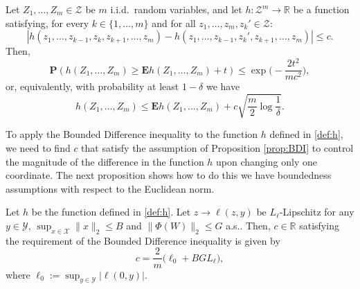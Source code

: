 \begin{proposition}
\label{prop:BDI}
Let $Z_1,\ldots,Z_m\in\mathcal{Z}$ be $m$ i.i.d.\ random variables, and let $h:\mathcal{Z}^m\rightarrow\mathbb{R}$ be a function satisfying, for every $k\in\{1,\ldots,m\}$ and for all $z_1,\ldots,z_m,z_k'\in\mathcal{Z}$:
$$
	| h(z_1,\ldots,z_{k-1},z_k,z_{k+1},\ldots,z_m) - h(z_1,\ldots,z_{k-1},z_k',z_{k+1},\ldots,z_m) | \le c.
$$
Then,
$$
	\mathbf{P}(h(Z_1,\ldots,Z_m) \ge \mathbf{E}h(Z_1,\ldots,Z_m) + t ) \le \exp\bigg(-\frac{2t^2}{m c^2}\bigg),
$$
or, equivalently, with probability at least $1-\delta$ we have
$$
	h(Z_1,\ldots,Z_m) \le \mathbf{E}h(Z_1,\ldots,Z_m) + c\sqrt{\frac{m}{2}\log\frac{1}{\delta}}.
$$
\end{proposition}
To apply the Bounded Difference inequality to the function $h$ defined in \eqref{def:h}, we need to find $c$ that satisfy the assumption of Proposition \ref{prop:BDI} to control the magnitude of the difference in the function $h$ upon changing only one coordinate. The next proposition shows how to do this we have boundedness assumptions with respect to the Euclidean norm.
\begin{proposition}
\label{prop:c}
Let $h$ be the function defined in \eqref{def:h}. Let $z\rightarrow \ell(z,y)$ be $L_\ell$-Lipschitz for any $y\in\mathcal{Y}$, $\sup_{x\in\mathcal{X}}\|x\|_2 \le B$ and $\|\Phi(W)\|_2\le G$ a.s.. Then, $c\in\mathbb{R}$ satisfying the requirement of the Bounded Difference inequality is given by
$$
	c = \frac{2}{m} \bigg(\ell_0 + BGL_\ell \bigg),
$$
where $\ell_0:=\sup_{y\in\mathcal{Y}} | \ell(0,y) |$.
\end{proposition}


